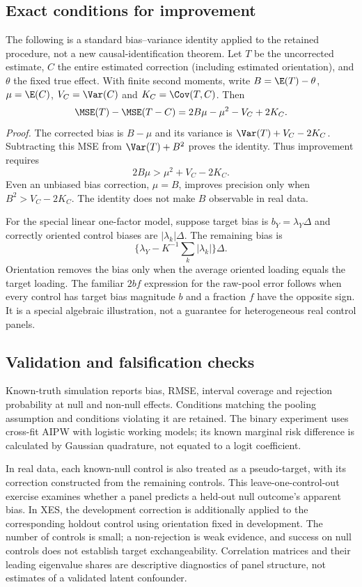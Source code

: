 \subsection{Exact conditions for improvement}

The following is a standard bias--variance identity applied to the retained procedure, not a new causal-identification theorem. Let $T$ be the uncorrected estimate, $C$ the entire estimated correction (including estimated orientation), and $\theta$ the fixed true effect. With finite second moments, write $B=\E(T)-\theta$, $\mu=\E(C)$, $V_C=\Var(C)$ and $K_C=\Cov(T,C)$. Then
\[
\MSE(T)-\MSE(T-C)=2B\mu-\mu^2-V_C+2K_C.
\]
\textit{Proof.} The corrected bias is $B-\mu$ and its variance is $\Var(T)+V_C-2K_C$. Subtracting this MSE from $\Var(T)+B^2$ proves the identity. Thus improvement requires
\[
2B\mu>\mu^2+V_C-2K_C.
\]
Even an unbiased bias correction, $\mu=B$, improves precision only when $B^2>V_C-2K_C$. The identity does not make $B$ observable in real data.

For the special linear one-factor model, suppose target bias is $b_Y=\lambda_Y\Delta$ and correctly oriented control biases are $|\lambda_k|\Delta$. The remaining bias is
\[
\{\lambda_Y-K^{-1}\sum_k|\lambda_k|\}\Delta.
\]
Orientation removes the bias only when the average oriented loading equals the target loading. The familiar $2bf$ expression for the raw-pool error follows when every control has target bias magnitude $b$ and a fraction $f$ have the opposite sign. It is a special algebraic illustration, not a guarantee for heterogeneous real control panels.

\subsection{Validation and falsification checks}

Known-truth simulation reports bias, RMSE, interval coverage and rejection probability at null and non-null effects. Conditions matching the pooling assumption and conditions violating it are retained. The binary experiment uses cross-fit AIPW with logistic working models; its known marginal risk difference is calculated by Gaussian quadrature, not equated to a logit coefficient.

In real data, each known-null control is also treated as a pseudo-target, with its correction constructed from the remaining controls. This leave-one-control-out exercise examines whether a panel predicts a held-out null outcome's apparent bias. In XES, the development correction is additionally applied to the corresponding holdout control using orientation fixed in development. The number of controls is small; a non-rejection is weak evidence, and success on null controls does not establish target exchangeability. Correlation matrices and their leading eigenvalue shares are descriptive diagnostics of panel structure, not estimates of a validated latent confounder.

